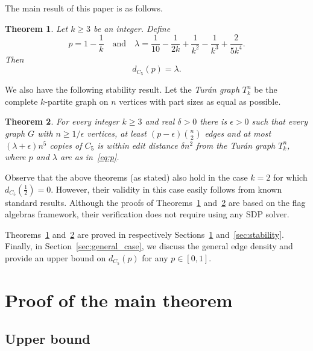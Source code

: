 \documentclass[12pt]{article}
\newcommand{\eps}{\epsilon}
\newtheorem{theorem}{Theorem} %
\theoremstyle{definition}
\theoremstyle{remark}
\renewcommand{\ge}{\geqslant}
\begin{document}
The main result of this paper is as follows.

\begin{theorem}\label{thm:main}
Let $k\ge 3$ be an integer. Define 
 \begin{equation}\label{eq:p}
 p=1-\frac{1}{k}\quad\mbox{and}\quad\lambda=\frac{1}{10} -\frac{1}{2k} + \frac{1}{k^2} - \frac{1}{k^3} + \frac{2}{5 k^4}.
 \end{equation}
 Then 
 $$d_{C_5}(p)=\lambda.$$
\end{theorem}
\noindent

We also have the following stability result. Let the \emph{Tur\'an graph} $T_k^n$ be the complete $k$-partite graph on $n$ vertices with part sizes as equal as possible.


\begin{theorem}\label{th:stab} For every integer $k\ge 3$ and real $\delta>0$ there is $\eps>0$ such that every graph $G$ with $n\ge 1/\eps$ vertices, at least $(p-\eps){n\choose 2}$ edges  and at most $(\lambda +\eps)n^5$
	copies of $C_5$ is within edit distance $\delta n^2$ from the Tur\'an graph $T_k^n$, where $p$ and $\lambda$ are as in~\eqref{eq:p}. 
\end{theorem}

Observe that the above theorems (as stated) also hold in the case $k=2$ for which $d_{C_5}(\frac{1}{2})=0$. However, their validity in this case easily follows from known standard results. 
Although the proofs of Theorems~\ref{thm:main} and~\ref{th:stab} are based on the flag algebras framework, their verification does not require using any SDP solver.

Theorems~\ref{thm:main} and~\ref{th:stab} are proved in respectively Sections~\ref{sec:main_thm} and~\ref{sec:stability}.
Finally, in Section~\ref{sec:general_case}, we discuss the general edge density and provide an upper bound on $d_{C_5}(p)$ for any $p\in [0,1]$.


\section{Proof of the main theorem}\label{sec:main_thm}

\subsection{Upper bound}
\end{document}
